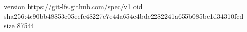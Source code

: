 version https://git-lfs.github.com/spec/v1
oid sha256:4c90bb48853c05eefc48227e7e44a654e4bde2282241a655b085bc1d34310fcd
size 87544
